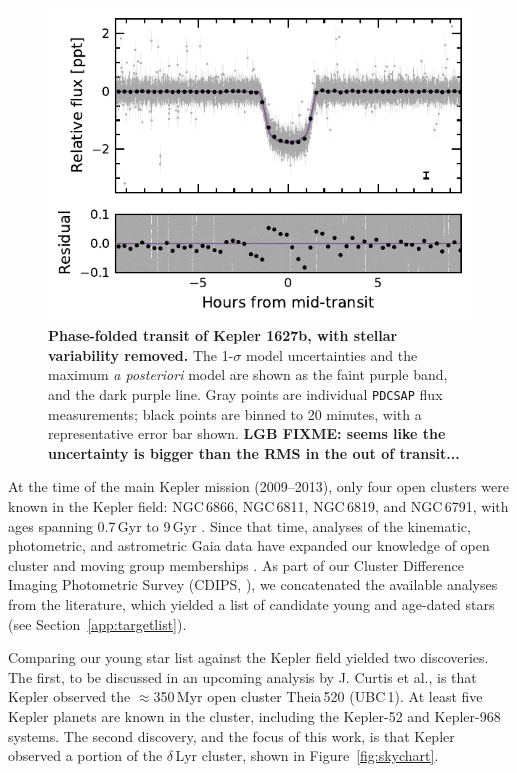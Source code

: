 \documentclass[12pt,modern,tighten]{aastex63}
\begin{document}
\begin{figure}[t]
	\begin{center}
		\leavevmode
		\includegraphics[width=1\textwidth]{f5.pdf}
	\end{center}
	\vspace{-0.7cm}
	\caption{
		{\bf Phase-folded transit of Kepler 1627b, with stellar
			variability removed.}  
    The 1-$\sigma$ model uncertainties and the maximum {\it a
    posteriori} model are shown as the faint purple band, and the dark
    purple line.  Gray points are individual \texttt{PDCSAP} flux
    measurements; black points are binned to 20 minutes, with a
    representative error bar shown.
    {\bf LGB FIXME: seems like the uncertainty is bigger than the RMS
    in the out of transit...}
		\label{fig:phasefold}
	}
\end{figure}

At the time of the main Kepler mission (2009--2013), only four open
clusters were known in the Kepler field: NGC\,6866, NGC\,6811,
NGC\,6819, and NGC\,6791, with ages spanning 0.7\,Gyr to 9\,Gyr
\citep{meibom_kepler_2011}.  Since that time, analyses of the
kinematic, photometric, and astrometric Gaia data have expanded our
knowledge of open cluster and moving group memberships \citep[{\it
e.g.},][]{cantatgaudin_gaia_2018,zari_3d_2018,kounkel_untangling_2019,Meingast2021}.
As part of our Cluster Difference Imaging Photometric Survey (CDIPS,
\citealt{bouma_cdipsI_2019}), we concatenated the available analyses
from the literature, which yielded a list of candidate young and
age-dated stars (see Section~\ref{app:targetlist}).

Comparing our young star list against the Kepler field yielded two
discoveries.  The first, to be discussed in an upcoming analysis
by J. Curtis et al{.}, is that Kepler observed the $\approx$350\,Myr
open cluster Theia\,520 (UBC\,1).  At least five Kepler planets are
known in the cluster, including the Kepler-52 and Kepler-968 systems.
The second discovery, and the focus of this work, is that Kepler
observed a portion of the $\delta$\,Lyr cluster, shown in
Figure~\ref{fig:skychart}.
\end{document}
